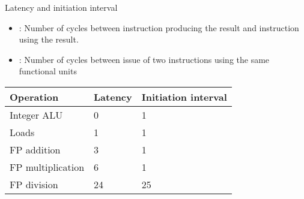 \begin{frame}[t]{Latency and initiation interval}
\begin{itemize}
  \item {}: Number of cycles between instruction producing
        the result and instruction using the result.
  \item {}: Number of cycles between issue of two instructions
        using the same functional units
\end{itemize}

{
\begin{tabular}[c]{*{3}{|p{.3\textwidth}}|}
\hline
Operation & Latency & Initiation interval
\\
\hline
\hline

Integer ALU &
0  &
1
\\
\hline

Loads &
1 &
1
\\
\hline

FP addition &
3 &
1
\\
\hline

FP multiplication &
6 &
1
\\
\hline

FP division &
24 &
25
\\

\hline
\end{tabular}
}

\end{frame} 
